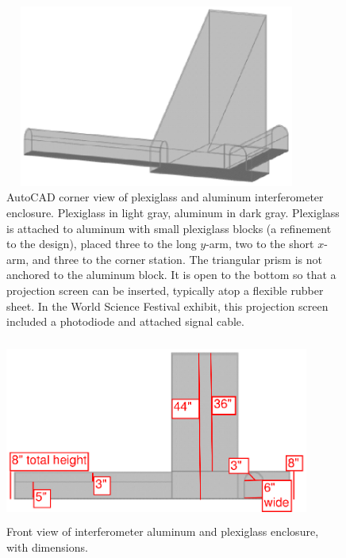 
        \begin{figure}
        \begin{center}
        \includegraphics[height=60mm, width=100mm]{view-corner.eps}
        \caption{AutoCAD corner view of plexiglass and aluminum interferometer enclosure. Plexiglass in light gray, aluminum in dark gray. Plexiglass is attached to aluminum with small plexiglass blocks (a refinement to the design), placed three to the long $y$-arm, two to the short $x$-arm, and three to the corner station. The triangular prism is not anchored to the aluminum block. It is open to the bottom so that a projection screen can be inserted, typically atop a flexible rubber sheet. In the World Science Festival exhibit, this projection screen included a photodiode and attached signal cable.}
        \label{plex-view-corner}
        \end{center}
        \end{figure}

        \begin{figure}
        \begin{center}
        \includegraphics[height=60mm, width=100mm]{view-front.eps}
        \caption{Front view of interferometer aluminum and plexiglass enclosure, with dimensions.}
        \label{plex-view-front}
        \end{center}
        \end{figure}



